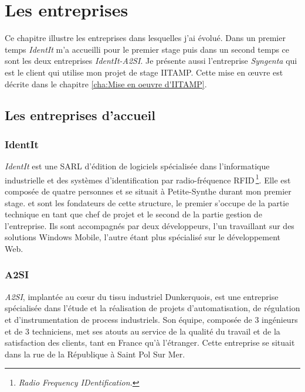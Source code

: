 \chapter{Les entreprises} %
\label{cha:Les entreprises}


\begin{it}

Ce chapitre illustre les entreprises dans lesquelles j'ai évolué. Dans
un premier temps \emph{IdentIt} m'a accueilli pour le premier stage puis
dans un second temps ce sont les deux entreprises \emph{IdentIt-A2SI}.
Je présente aussi l'entreprise \emph{Syngenta} qui est le client qui
utilise mon projet de stage IITAMP. Cette mise en \oe{}uvre est décrite
dans le chapitre \ref{cha:Mise en oeuvre d'IITAMP}.

\end{it}

\section{Les entreprises d'accueil} %
\label{sec:Les entreprises d'accueil}

\subsection{IdentIt} %
\label{sub:IdentIt}

\emph{IdentIt} est une SARL d'édition de logiciels spécialisée dans
l'informatique industrielle et des systèmes d'identification par
radio-fréquence RFID\,\footnote{\emph{Radio Frequency IDentification.}}.
Elle est composée de quatre personnes et se situait à Petite-Synthe
durant mon premier stage.  et  sont les
fondateurs de cette structure, le premier s'occupe de la partie
technique en tant que chef de projet et le second de la partie gestion
de l'entreprise. Ils sont accompagnés par deux développeurs, l'un
travaillant sur des solutions Windows Mobile, l'autre étant plus
spécialisé sur le développement Web.


\subsection{A2SI} %
\label{sub:A2SI}

\emph{A2SI}, implantée au c\oe{}ur du tissu industriel Dunkerquois, est
une entreprise spécialisée dans l’étude et la réalisation de projets
d’automatisation, de régulation et d’instrumentation de process
industriels. Son équipe, composée de 3 ingénieurs et de 3 techniciens,
met ses atouts au service de la qualité du travail et de la satisfaction
des clients, tant en France qu’à l’étranger. Cette entreprise se situait
dans la rue de la République à Saint Pol Sur Mer.

